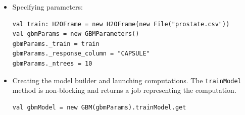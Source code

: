 \documentclass{standalone}
\begin{document}
\begin{itemize}
	\item Specifying parameters:
\begin{lstlisting}[style=Scala]
val train: H2OFrame = new H2OFrame(new File("prostate.csv"))
val gbmParams = new GBMParameters()
gbmParams._train = train
gbmParams._response_column = "CAPSULE"
gbmParams._ntrees = 10
\end{lstlisting}

	\item Creating the model builder and launching computations. The \texttt{trainModel} method is non-blocking and returns a job representing the computation.
\begin{lstlisting}[style=Scala]
val gbmModel = new GBM(gbmParams).trainModel.get
\end{lstlisting}
\end{itemize}
\end{document}
